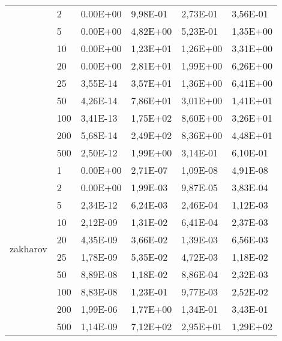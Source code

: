 \begin{longtable}[c]{|p{3.5cm}|l|l|l|l|l|}
                                        & 2         & 0.00E+00   & 9,98E-01   & 2,73E-01   & 3,56E-01  \\ \cline{2-6} 
                                        & 5         & 0.00E+00   & 4,82E+00   & 5,23E-01   & 1,35E+00  \\ \cline{2-6} 
                                        & 10        & 0.00E+00   & 1,23E+01   & 1,26E+00   & 3,31E+00  \\ \cline{2-6} 
                                        & 20        & 0.00E+00   & 2,81E+01   & 1,99E+00   & 6,26E+00  \\ \cline{2-6} 
                                        & 25        & 3,55E-14   & 3,57E+01   & 1,36E+00   & 6,41E+00  \\ \cline{2-6} 
                                        & 50        & 4,26E-14   & 7,86E+01   & 3,01E+00   & 1,41E+01  \\ \cline{2-6} 
                                        & 100       & 3,41E-13   & 1,75E+02   & 8,60E+00   & 3,26E+01  \\ \cline{2-6} 
                                        & 200       & 5,68E-14   & 2,49E+02   & 8,36E+00   & 4,48E+01  \\ \cline{2-6} 
                                        & 500       & 2,50E-12   & 1,99E+00   & 3,14E-01   & 6,10E-01  \\ \hline
\multirow[t]{10}{*}{zakharov}              & 1         & 0.00E+00   & 2,71E-07   & 1,09E-08   & 4,91E-08  \\ \cline{2-6} 
                                        & 2         & 0.00E+00   & 1,99E-03   & 9,87E-05   & 3,83E-04  \\ \cline{2-6} 
                                        & 5         & 2,34E-12   & 6,24E-03   & 2,46E-04   & 1,12E-03  \\ \cline{2-6} 
                                        & 10        & 2,12E-09   & 1,31E-02   & 6,41E-04   & 2,37E-03  \\ \cline{2-6} 
                                        & 20        & 4,35E-09   & 3,66E-02   & 1,39E-03   & 6,56E-03  \\ \cline{2-6} 
                                        & 25        & 1,78E-09   & 5,35E-02   & 4,72E-03   & 1,18E-02  \\ \cline{2-6} 
                                        & 50        & 8,89E-08   & 1,18E-02   & 8,86E-04   & 2,32E-03  \\ \cline{2-6} 
                                        & 100       & 8,83E-08   & 1,23E-01   & 9,77E-03   & 2,52E-02  \\ \cline{2-6} 
                                        & 200       & 1,99E-06   & 1,77E+00   & 1,34E-01   & 3,43E-01  \\ \cline{2-6} 
                                        & 500       & 1,14E-09   & 7,12E+02   & 2,95E+01   & 1,29E+02  \\ \hline
\end{longtable}


